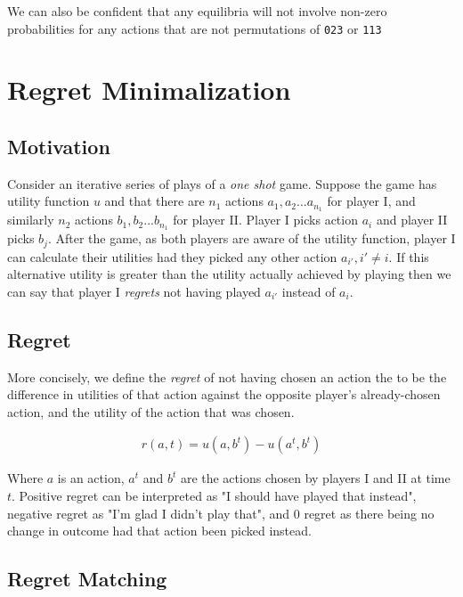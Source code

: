 \documentclass [11pt]{article}
\begin{document}
We can also be confident that any equilibria  will not involve non-zero probabilities for any actions that are not permutations of \texttt{023} or \texttt{113}

\pagebreak

\section{Regret Minimalization}

\subsection{Motivation}

Consider an iterative series of plays of a \textit{one shot} game. Suppose the game has utility function $u$ and that there are $n_1$ actions $a_1, a_2 ... a_{ n_1 }$ for player I, and similarly $n_2$ actions $b_1, b_2 ... b_{ n_1 }$ for player II. Player I picks action $a_i$ and player II picks $b_j$. After the game, as both players are aware of the utility function, player I can calculate their utilities had they picked any other action $a_{i'}, i' \neq i$. If this alternative utility is greater than the utility actually achieved by playing then we can say that player I \textit{regrets} not having played $a_{i'}$ instead of $a_i$.

\subsection{Regret}

More concisely, we define the \textit{regret} of not having chosen an action the to be the difference in utilities of that action against the opposite player's already-chosen action, and the utility of the action that was chosen.

\begin{align}
  r(a, t) = u(a, b^t) - u(a^t, b^t)
\end{align}

Where $a$ is an action, $a^t$ and $b^t$ are the actions chosen by players I and II at time $t$. Positive regret can be interpreted as "I should have played that instead", negative regret as "I'm glad I didn't play that", and 0 regret as there being no change in outcome had that action been picked instead.

\subsection{Regret Matching}
\end{document}
